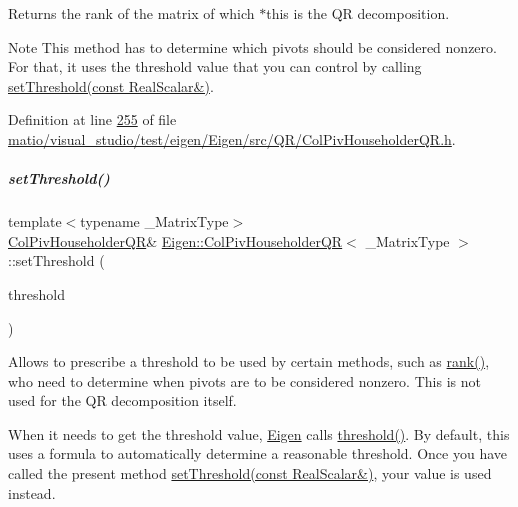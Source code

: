 \begin{DoxyReturn}{Returns}
the rank of the matrix of which $\ast$this is the QR decomposition.
\end{DoxyReturn}
\begin{DoxyNote}{Note}
This method has to determine which pivots should be considered nonzero. For that, it uses the threshold value that you can control by calling \hyperlink{group___q_r___module_ae712cdc9f0e521cfc8061bee58ff55ee}{set\+Threshold(const Real\+Scalar\&)}. 
\end{DoxyNote}


Definition at line \hyperlink{matio_2visual__studio_2test_2eigen_2_eigen_2src_2_q_r_2_col_piv_householder_q_r_8h_source_l00255}{255} of file \hyperlink{matio_2visual__studio_2test_2eigen_2_eigen_2src_2_q_r_2_col_piv_householder_q_r_8h_source}{matio/visual\+\_\+studio/test/eigen/\+Eigen/src/\+Q\+R/\+Col\+Piv\+Householder\+Q\+R.\+h}.

\mbox{\label{group___q_r___module_ae712cdc9f0e521cfc8061bee58ff55ee}} 
\subparagraph{\texorpdfstring{set\+Threshold()}{setThreshold()}\hspace{0.1cm}{\footnotesize\ttfamily [1/4]}}
{\footnotesize\ttfamily template$<$typename \+\_\+\+Matrix\+Type$>$ \\
\hyperlink{group___q_r___module_class_eigen_1_1_col_piv_householder_q_r}{Col\+Piv\+Householder\+QR}\& \hyperlink{group___q_r___module_class_eigen_1_1_col_piv_householder_q_r}{Eigen\+::\+Col\+Piv\+Householder\+QR}$<$ \+\_\+\+Matrix\+Type $>$\+::set\+Threshold (\begin{DoxyParamCaption}\item[{const Real\+Scalar \&}]{threshold }\end{DoxyParamCaption})\hspace{0.3cm}{\ttfamily [inline]}}

Allows to prescribe a threshold to be used by certain methods, such as \hyperlink{group___q_r___module_a2a59aaa689613ce5ef0c9130ad33940e}{rank()}, who need to determine when pivots are to be considered nonzero. This is not used for the QR decomposition itself.

When it needs to get the threshold value, \hyperlink{namespace_eigen}{Eigen} calls \hyperlink{group___q_r___module_a72276adb1aa11f870f50d0bd58af014d}{threshold()}. By default, this uses a formula to automatically determine a reasonable threshold. Once you have called the present method \hyperlink{group___q_r___module_ae712cdc9f0e521cfc8061bee58ff55ee}{set\+Threshold(const Real\+Scalar\&)}, your value is used instead.


